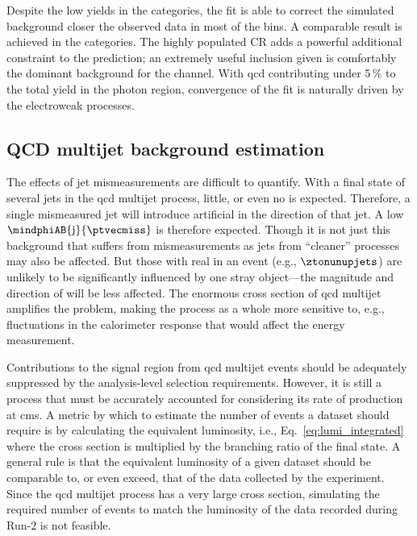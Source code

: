 Despite the low yields in the \ttH categories, the fit is able to correct the simulated background closer the observed data in most of the bins. A comparable result is achieved in the \VH categories. The highly populated \singlePhotonCr \gls{CR} adds a powerful additional constraint to the prediction; an extremely useful inclusion given \ztonunu is comfortably the dominant background for the \VH channel. With \acrshort{qcd} contributing under 5\,\% to the total yield in the photon region, convergence of the fit is naturally driven by the electroweak processes.




\subsection{QCD multijet background estimation}
\label{subsec:htoinv_qcd_multijet_bkg}

The effects of \gls{jet} mismeasurements are difficult to quantify. With a final state of several \glspl{jet} in the \acrshort{qcd} multijet process, little, or even no \ptvecmiss is expected. Therefore, a single mismeasured \gls{jet} will introduce artificial \ptvecmiss in the direction of that jet. A low $\mindphiAB{\mathrm{j}}{\ptvecmiss}$ is therefore expected. Though it is not just this background that suffers from mismeasurements as \glspl{jet} from ``cleaner'' processes may also be affected. But those with real \ptmiss in an event (e.g., $\ztonunupjets$) are unlikely to be significantly influenced by one stray object---the magnitude and direction of \ptvecmiss will be less affected. The enormous cross section of \acrshort{qcd} multijet amplifies the problem, making the process as a whole more sensitive to, e.g., fluctuations in the calorimeter response that would affect the energy measurement.

Contributions to the signal region from \acrshort{qcd} multijet events should be adequately suppressed by the analysis-level selection requirements. However, it is still a process that must be accurately accounted for considering its rate of production at \acrshort{cms}. A metric by which to estimate the number of events a dataset should require is by calculating the equivalent luminosity, i.e., Eq.~\ref{eq:lumi_integrated} where the cross section is multiplied by the branching ratio of the final state. A general rule is that the equivalent luminosity of a given dataset should be comparable to, or even exceed, that of the data collected by the experiment. Since the \acrshort{qcd} multijet process has a very large cross section, simulating the required number of events to match the luminosity of the data recorded during Run-2 is not feasible.

